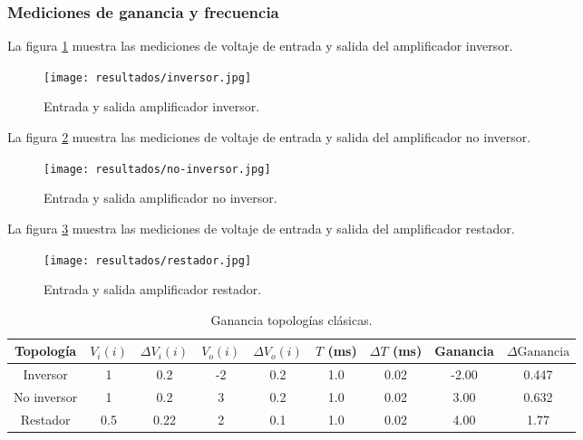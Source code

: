 \FloatBarrier
\subsubsection{Mediciones de ganancia y frecuencia}

La figura \ref{fig:entrada-salida-inversor} muestra las mediciones de voltaje de entrada y salida del amplificador inversor.

\begin{figure}[hb]
    \centering
    \texttt{[image: resultados/inversor.jpg]}
    \caption{Entrada y salida amplificador inversor.}
    \label{fig:entrada-salida-inversor}
\end{figure}

La figura \ref{fig:entrada-salida-no-inversor} muestra las mediciones de voltaje de entrada y salida del amplificador no inversor.

\begin{figure}[ht]
    \centering
    \texttt{[image: resultados/no-inversor.jpg]}
    \caption{Entrada y salida amplificador no inversor.}
    \label{fig:entrada-salida-no-inversor}
\end{figure}

La figura \ref{fig:entrada-salida-restador} muestra las mediciones de voltaje de entrada y salida del amplificador restador.

\begin{figure}[ht]
    \centering
    \texttt{[image: resultados/restador.jpg]}
    \caption{Entrada y salida amplificador restador.}
    \label{fig:entrada-salida-restador}
\end{figure}



\begin{table}[ht]
\centering
\begin{tabular}{|c|c|c|c|c|c|c|c|c|}
\hline
Topología & \(V_i(i)\) & \(\Delta V_i(i)\) & \(V_o(i)\) & \(\Delta V_o(i)\) & \(T\) (ms) & \(\Delta T\) (ms) & Ganancia & \(\Delta \text{Ganancia}\) \\ \hline
Inversor & 1         & 0.2               & -2         & 0.2               & 1.0        & 0.02              & -2.00             & 0.447 \\ \hline
No inversor & 1         & 0.2               & 3          & 0.2               & 1.0        & 0.02              & 3.00              & 0.632 \\ \hline
Restador & 0.5       & 0.22              & 2          & 0.1               & 1.0        & 0.02              & 4.00              & 1.77 \\ \hline
\end{tabular}
\caption{Ganancia topologías clásicas.}
\label{tab:resultados-ganancia-frecuencia-topologias-basicas}
\end{table}

